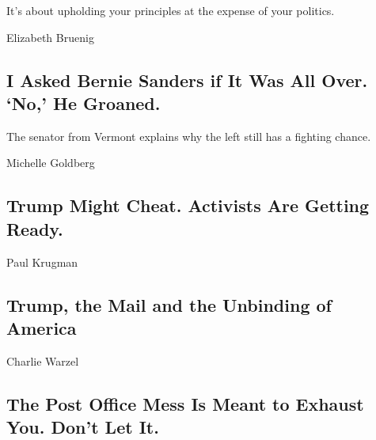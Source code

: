 It's about upholding your principles at the expense of your politics.

\href{/2020/08/17/opinion/bernie-sanders-joe-biden.html}{}

Elizabeth Bruenig

\hypertarget{i-asked-bernie-sanders-if-it-was-all-over-no-he-groaned}{%
\subsection{I Asked Bernie Sanders if It Was All Over. `No,' He
Groaned.}\label{i-asked-bernie-sanders-if-it-was-all-over-no-he-groaned}}

The senator from Vermont explains why the left still has a fighting
chance.

\href{/2020/08/17/opinion/bernie-sanders-joe-biden.html}{}

\href{/2020/08/17/opinion/trump-contested-election-protests.html}{}

Michelle Goldberg

\hypertarget{trump-might-cheat-activists-are-getting-ready}{%
\subsection{Trump Might Cheat. Activists Are Getting
Ready.}\label{trump-might-cheat-activists-are-getting-ready}}

\href{/2020/08/17/opinion/trump-us-mail.html}{}

Paul Krugman

\hypertarget{trump-the-mail-and-the-unbinding-of-america}{%
\subsection{Trump, the Mail and the Unbinding of
America}\label{trump-the-mail-and-the-unbinding-of-america}}

\href{/2020/08/17/opinion/trump-post-office-election.html}{}

Charlie Warzel

\hypertarget{the-post-office-mess-is-meant-to-exhaust-you-dont-let-it}{%
\subsection{The Post Office Mess Is Meant to Exhaust You. Don't Let
It.}\label{the-post-office-mess-is-meant-to-exhaust-you-dont-let-it}}

\href{/2020/08/17/opinion/coronavirus-cities-suburbs.html}{}


